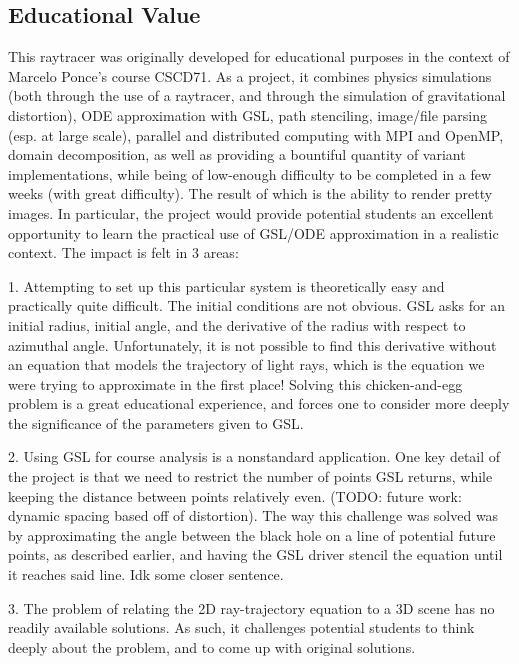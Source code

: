 \subsection{Educational Value}


This raytracer was originally developed for educational purposes in the context of Marcelo Ponce's course CSCD71. As a project, it combines physics simulations (both through the use of a raytracer, and through the simulation of gravitational distortion), ODE approximation with GSL, path stenciling, image/file parsing (esp. at large scale), parallel and distributed computing with MPI and OpenMP, domain decomposition, as well as providing a bountiful quantity of variant implementations, while being of low-enough difficulty to be completed in a few weeks (with great difficulty). The result of which is the ability to render pretty images. In particular, the project would provide potential students an excellent opportunity to learn the practical use of GSL/ODE approximation in a realistic context. The impact is felt in 3 areas:

1. Attempting to set up this particular system is theoretically easy and practically quite difficult. The initial conditions are not obvious. GSL asks for an initial radius, initial angle, and the derivative of the radius with respect to azimuthal angle. Unfortunately, it is not possible to find this derivative without an equation that models the trajectory of light rays, which is the equation we were trying to approximate in the first place! Solving this chicken-and-egg problem is a great educational experience, and forces one to consider more deeply the significance of the parameters given to GSL. 

2. Using GSL for course analysis is a nonstandard application. One key detail of the project is that we need to restrict the number of points GSL returns, while keeping the distance between points relatively even. (TODO: future work: dynamic spacing based off of distortion). The way this challenge was solved was by approximating the angle between the black hole on a line of potential future points, as described earlier, and having the GSL driver stencil the equation until it reaches said line. Idk some closer sentence.

3. The problem of relating the 2D ray-trajectory equation to a 3D scene has no readily available solutions. As such, it challenges potential students to think deeply about the problem, and to come up with original solutions.

